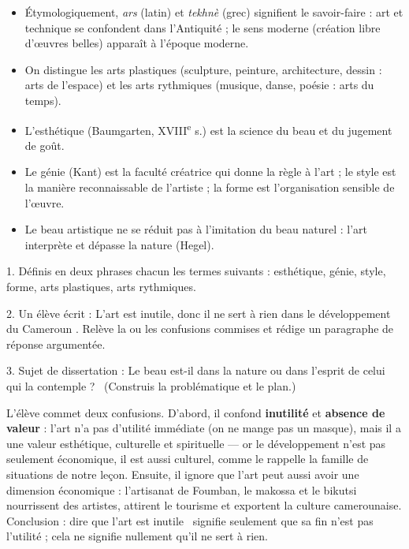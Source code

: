 \documentclass[11pt]{article}
\newcommand{\cle}[1]{{\popxbold\color{popdark}#1}}
\begin{document}
\begin{aretenir}
\begin{itemize}
\item Étymologiquement, \emph{ars} (latin) et \emph{tekhnè} (grec) signifient le savoir-faire : art et technique se confondent dans l'Antiquité ; le sens moderne (création libre d'œuvres belles) apparaît à l'époque moderne.
\item On distingue les \cle{arts plastiques} (sculpture, peinture, architecture, dessin : arts de l'espace) et les \cle{arts rythmiques} (musique, danse, poésie : arts du temps).
\item L'\cle{esthétique} (Baumgarten, XVIII\textsuperscript{e} s.) est la science du beau et du jugement de goût.
\item Le \cle{génie} (Kant) est la faculté créatrice qui donne la règle à l'art ; le \cle{style} est la manière reconnaissable de l'artiste ; la \cle{forme} est l'organisation sensible de l'œuvre.
\item Le beau artistique ne se réduit pas à l'imitation du beau naturel : l'art interprète et dépasse la nature (Hegel).
\end{itemize}
\end{aretenir}

\begin{exercice}
1. Définis en deux phrases chacun les termes suivants : esthétique, génie, style, forme, arts plastiques, arts rythmiques.

2. Un élève écrit : \guillemotleft L'art est inutile, donc il ne sert à rien dans le développement du Cameroun \guillemotright. Relève la ou les confusions commises et rédige un paragraphe de réponse argumentée.

3. Sujet de dissertation : \guillemotleft Le beau est-il dans la nature ou dans l'esprit de celui qui la contemple ? \guillemotright\ (Construis la problématique et le plan.)
\end{exercice}

\begin{corrige}[Exercice 2]
L'élève commet deux confusions. D'abord, il confond \textbf{inutilité} et \textbf{absence de valeur} : l'art n'a pas d'utilité immédiate (on ne mange pas un masque), mais il a une valeur esthétique, culturelle et spirituelle — or le développement n'est pas seulement économique, il est aussi culturel, comme le rappelle la famille de situations de notre leçon. Ensuite, il ignore que l'art peut aussi avoir une dimension économique : l'artisanat de Foumban, le makossa et le bikutsi nourrissent des artistes, attirent le tourisme et exportent la culture camerounaise. Conclusion : dire que l'art est \guillemotleft inutile \guillemotright\ signifie seulement que sa fin n'est pas l'utilité ; cela ne signifie nullement qu'il ne sert à rien.
\end{corrige}
\end{document}
